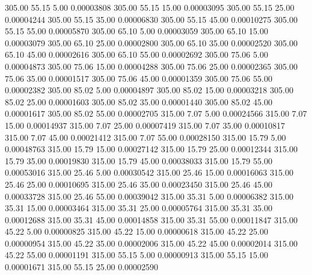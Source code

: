     305.00     55.15      5.00     0.00003808
    305.00     55.15     15.00     0.00003095
    305.00     55.15     25.00     0.00004244
    305.00     55.15     35.00     0.00006830
    305.00     55.15     45.00     0.00010275
    305.00     55.15     55.00     0.00005870
    305.00     65.10      5.00     0.00003059
    305.00     65.10     15.00     0.00003079
    305.00     65.10     25.00     0.00002800
    305.00     65.10     35.00     0.00002520
    305.00     65.10     45.00     0.00002616
    305.00     65.10     55.00     0.00002692
    305.00     75.06      5.00     0.00004873
    305.00     75.06     15.00     0.00004288
    305.00     75.06     25.00     0.00002365
    305.00     75.06     35.00     0.00001517
    305.00     75.06     45.00     0.00001359
    305.00     75.06     55.00     0.00002382
    305.00     85.02      5.00     0.00004897
    305.00     85.02     15.00     0.00003218
    305.00     85.02     25.00     0.00001603
    305.00     85.02     35.00     0.00001440
    305.00     85.02     45.00     0.00001617
    305.00     85.02     55.00     0.00002705
    315.00      7.07      5.00     0.00024566
    315.00      7.07     15.00     0.00014937
    315.00      7.07     25.00     0.00007419
    315.00      7.07     35.00     0.00010817
    315.00      7.07     45.00     0.00021412
    315.00      7.07     55.00     0.00028150
    315.00     15.79      5.00     0.00048763
    315.00     15.79     15.00     0.00027142
    315.00     15.79     25.00     0.00012344
    315.00     15.79     35.00     0.00019830
    315.00     15.79     45.00     0.00038033
    315.00     15.79     55.00     0.00053016
    315.00     25.46      5.00     0.00030542
    315.00     25.46     15.00     0.00016063
    315.00     25.46     25.00     0.00010695
    315.00     25.46     35.00     0.00023450
    315.00     25.46     45.00     0.00033728
    315.00     25.46     55.00     0.00039042
    315.00     35.31      5.00     0.00006382
    315.00     35.31     15.00     0.00003464
    315.00     35.31     25.00     0.00005764
    315.00     35.31     35.00     0.00012688
    315.00     35.31     45.00     0.00014858
    315.00     35.31     55.00     0.00011847
    315.00     45.22      5.00     0.00000825
    315.00     45.22     15.00     0.00000618
    315.00     45.22     25.00     0.00000954
    315.00     45.22     35.00     0.00002006
    315.00     45.22     45.00     0.00002014
    315.00     45.22     55.00     0.00001191
    315.00     55.15      5.00     0.00000913
    315.00     55.15     15.00     0.00001671
    315.00     55.15     25.00     0.00002590
